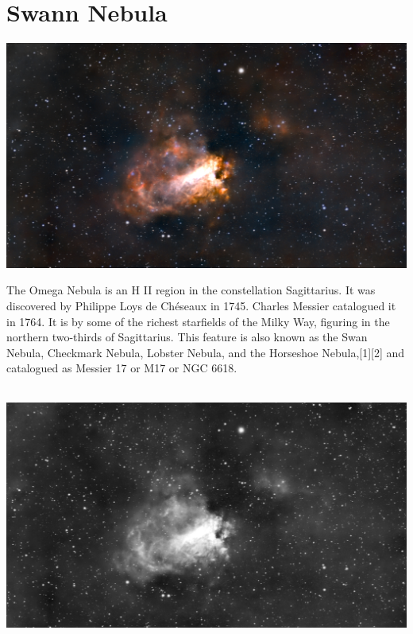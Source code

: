 \ \\\section{Swann Nebula}
\includegraphics[width=\textwidth]{../Imaging//Original/Swann_Nebula.jpg}
{\footnotesize\color{white}
The Omega Nebula is an H II region in the constellation Sagittarius. It was discovered by Philippe Loys de Chéseaux in 1745. Charles Messier catalogued it in 1764. It is by some of the richest starfields of the Milky Way, figuring in the northern two-thirds of Sagittarius. This feature is also known as the Swan Nebula, Checkmark Nebula, Lobster Nebula, and the Horseshoe Nebula,[1][2] and catalogued as Messier 17 or M17 or NGC 6618.


}\ \\
\includegraphics[width=\textwidth]{../Imaging//Grayscale/Swann_Nebula.jpg}
